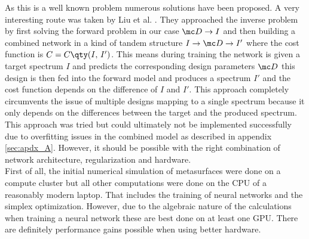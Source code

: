 \indent As this is a well known problem numerous solutions have been proposed. A very interesting route was taken by Liu et al. \cite{Liu2018}. They approached the inverse problem by first solving the forward problem in our case $\mc D \rightarrow I$ and then building a combined network in a kind of tandem structure 
$I \rightarrow \mc D \rightarrow I'$
where the cost function is 
$C = C \qty(I, \, I')$.
This means during training the network is given a target spectrum $I$ and predicts the corresponding design parameters $\mc D$ this design is then fed into the forward model and produces a spectrum $I'$ and the cost function depends on the difference of $I$ and $I'$. This approach completely circumvents the issue of multiple designs mapping to a single spectrum because it only depends on the differences between the target and the produced spectrum. This approach was tried but could ultimately not be implemented successfully due to overfitting issues in the combined model as described in appendix \ref{sec:apdx_A}. However, it should be possible with the right combination of network architecture, regularization and hardware.
\\    



First of all, the initial numerical simulation of metasurfaces were done on a compute cluster but all other computations were done on the CPU of a reasonably modern laptop. That includes the training of neural networks and the simplex optimization. However, due to the algebraic nature of the calculations when training a neural network these are best done on at least one GPU. There are definitely performance gains possible when using better hardware.
\\

\indent

